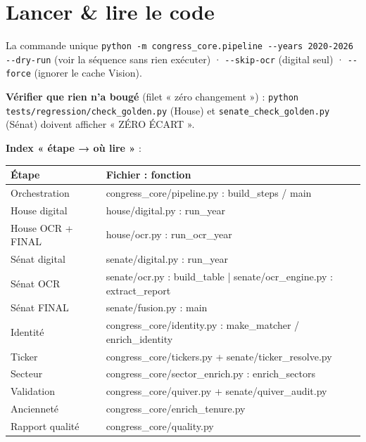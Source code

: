 \documentclass[11pt,a4paper]{article}
\newcommand{\co}[1]{\texttt{\small #1}}
\begin{document}
\section{Lancer \& lire le code}

\begin{keybox}{La commande unique}
\co{python -m congress_core.pipeline -{}-years 2020-2026}\\
\co{-{}-dry-run} (voir la séquence sans rien exécuter) · \co{-{}-skip-ocr} (digital seul) · \co{-{}-force}
(ignorer le cache Vision).
\end{keybox}

\textbf{Vérifier que rien n'a bougé} (filet « zéro changement ») :
\co{python tests/regression/check_golden.py} (House) et \co{senate_check_golden.py} (Sénat) doivent
afficher « ZÉRO ÉCART ».

\textbf{Index « étape → où lire »} :
\begin{center}\small
\begin{tabular}{l >{\ttfamily\footnotesize}p{12.3cm}}
\toprule
\bfseries Étape & \normalfont\bfseries Fichier : fonction \\
\midrule
Orchestration & congress_core/pipeline.py : build_steps / main \\
House digital & house/digital.py : run_year \\
House OCR + FINAL & house/ocr.py : run_ocr_year \\
Sénat digital & senate/digital.py : run_year \\
Sénat OCR & senate/ocr.py : build_table \;|\; senate/ocr_engine.py : extract_report \\
Sénat FINAL & senate/fusion.py : main \\
Identité & congress_core/identity.py : make_matcher / enrich_identity \\
Ticker & congress_core/tickers.py \;+\; senate/ticker_resolve.py \\
Secteur & congress_core/sector_enrich.py : enrich_sectors \\
Validation & congress_core/quiver.py \;+\; senate/quiver_audit.py \\
Ancienneté & congress_core/enrich_tenure.py \\
Rapport qualité & congress_core/quality.py \\
\bottomrule
\end{tabular}
\end{center}
\end{document}
